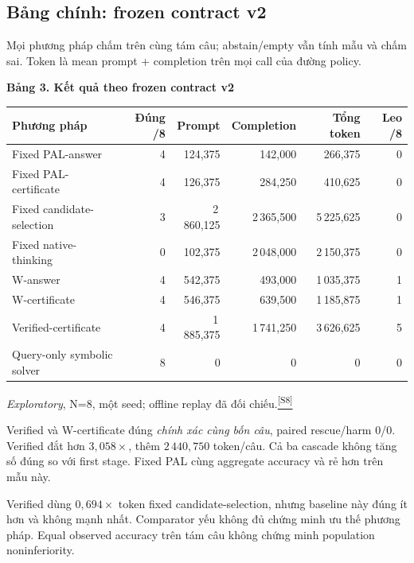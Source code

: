 \documentclass[11pt,a4paper]{article}
\newcommand{\src}[1]{\hyperlink{src-#1}{\textcolor{muted}{\textsuperscript{[S#1]}}}}
\newcommand{\exploratory}{\textit{Exploratory}}
\newcommand{\tabletitle}[1]{\par\addvspace{5pt}\Needspace{6\baselineskip}
  {\sffamily\small\bfseries #1}\par\nobreak}
\begin{document}
\subsection{Bảng chính: frozen contract v2}
Mọi phương pháp chấm trên cùng tám câu; abstain/empty vẫn tính mẫu và chấm sai. Token là mean prompt + completion trên mọi call của đường policy.
\tabletitle{Bảng 3. Kết quả theo frozen contract v2}
\begin{center}\small
\begin{tabularx}{\textwidth}{@{}Yrrrrr@{}}
\toprule
\textbf{Phương pháp} & \textbf{Đúng /8} & \textbf{Prompt} & \textbf{Completion} & \textbf{Tổng token} & \textbf{Leo /8}\\
\midrule
Fixed PAL-answer & 4 & 124,375 & 142,000 & 266,375 & 0\\
Fixed PAL-certificate & 4 & 126,375 & 284,250 & 410,625 & 0\\
Fixed candidate-selection & 3 & 2\,860,125 & 2\,365,500 & 5\,225,625 & 0\\
Fixed native-thinking & 0 & 102,375 & 2\,048,000 & 2\,150,375 & 0\\
W-answer & 4 & 542,375 & 493,000 & 1\,035,375 & 1\\
W-certificate & 4 & 546,375 & 639,500 & 1\,185,875 & 1\\
Verified-certificate & 4 & 1\,885,375 & 1\,741,250 & 3\,626,625 & 5\\
Query-only symbolic solver & 8 & 0 & 0 & 0 & 0\\
\bottomrule
\end{tabularx}
\end{center}
\exploratory, N=8, một seed; offline replay đã đối chiếu.\src{8}

Verified và W-certificate đúng \emph{chính xác cùng bốn câu}, paired rescue/harm 0/0. Verified đắt hơn $3{,}058\times$, thêm $2\,440{,}750$ token/câu. Cả ba cascade không tăng số đúng so với first stage. Fixed PAL cùng aggregate accuracy và rẻ hơn trên mẫu này.

Verified dùng $0{,}694\times$ token fixed candidate-selection, nhưng baseline này đúng ít hơn và không mạnh nhất. Comparator yếu không đủ chứng minh ưu thế phương pháp. Equal observed accuracy trên tám câu không chứng minh population noninferiority.
\end{document}
